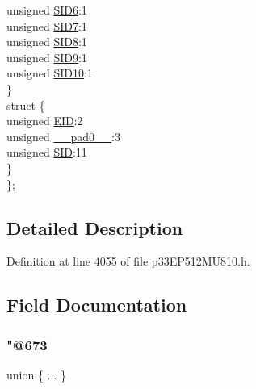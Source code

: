 \begin{DoxyCompactItemize}
\begin{tabbing}
\>\>unsigned \hyperlink{structtag_c1_r_x_f6_s_i_d_b_i_t_s_a70d70952133eb2389d5c326f9f0e8035}{SID6}:1\\
\>\>unsigned \hyperlink{structtag_c1_r_x_f6_s_i_d_b_i_t_s_a34097fb76decd431701fa2d86a22328e}{SID7}:1\\
\>\>unsigned \hyperlink{structtag_c1_r_x_f6_s_i_d_b_i_t_s_afe74894633244fdb0b0c01b4e8c522e7}{SID8}:1\\
\>\>unsigned \hyperlink{structtag_c1_r_x_f6_s_i_d_b_i_t_s_a33587704948067005c2a6a3ccc503c99}{SID9}:1\\
\>\>unsigned \hyperlink{structtag_c1_r_x_f6_s_i_d_b_i_t_s_a1a9084031c7f5fb16007feeebf0d8216}{SID10}:1\\
\>\} \\
\>struct \{\\
\>\>unsigned \hyperlink{structtag_c1_r_x_f6_s_i_d_b_i_t_s_ae80b378c9141f7c03e0b4e55b5f4b54d}{EID}:2\\
\>\>unsigned \hyperlink{structtag_c1_r_x_f6_s_i_d_b_i_t_s_adf71f3d8410c1f1dbbc96680a92c49af}{\_\_pad0\_\_}:3\\
\>\>unsigned \hyperlink{structtag_c1_r_x_f6_s_i_d_b_i_t_s_af88edf93b2fee2432665bd84f51287e4}{SID}:11\\
\>\} \\
\}; \\

\end{tabbing}\end{DoxyCompactItemize}


\subsection{Detailed Description}


Definition at line 4055 of file p33\+E\+P512\+M\+U810.\+h.



\subsection{Field Documentation}
\mbox{\label{structtag_c1_r_x_f6_s_i_d_b_i_t_s_ae7fe114f7b6e70b3e14a186bfa2ebefe}} 
\subsubsection{\texorpdfstring{"@673}{@673}}
{\footnotesize\ttfamily union \{ ... \} }

\mbox{\label{structtag_c1_r_x_f6_s_i_d_b_i_t_s_adf71f3d8410c1f1dbbc96680a92c49af}} 
